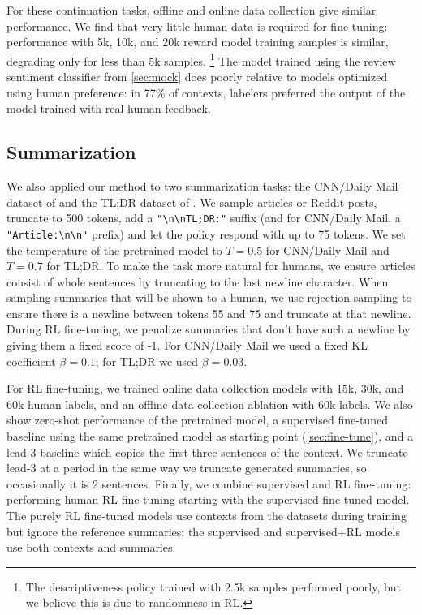 For these continuation tasks, offline and online data collection give similar performance. We find that very little human data is required for fine-tuning: performance with 5k, 10k, and 20k reward model training samples is similar, degrading only for less than 5k samples.
\footnote{The descriptiveness policy trained with 2.5k samples performed poorly, but we believe this is due to randomness in RL.} The model trained using the review sentiment classifier from \ref{sec:mock} does poorly relative to models optimized using human preference: in 77\% of contexts, labelers preferred the output of the model trained with real human feedback.

\subsection{Summarization \label{sec:summarization}}

We also applied our method to two summarization tasks: the CNN/Daily Mail dataset of \citet{hermann2015teaching} and the TL;DR dataset of \citet{volske2017tldr}. We sample articles or Reddit posts, truncate to 500 tokens, add a \verb+"\n\nTL;DR:"+ suffix (and for CNN/Daily Mail, a \verb+"Article:\n\n"+ prefix) and let the policy respond with up to 75 tokens.  We set the temperature of the pretrained model to $T = 0.5$ for CNN/Daily Mail and $T = 0.7$ for TL;DR.  To make the task more natural for humans, we ensure articles consist of whole sentences by truncating to the last newline character. When sampling summaries that will be shown to a human, we use rejection sampling to ensure there is a newline between tokens 55 and 75 and truncate at that newline. During RL fine-tuning, we penalize summaries that don't have such a newline by giving them a fixed score of -1. For CNN/Daily Mail we used a fixed KL coefficient $\beta = 0.1$; for TL;DR we used $\beta = 0.03$.

For RL fine-tuning, we trained online data collection models with 15k, 30k, and 60k human labels, and an offline data collection ablation with 60k labels.  We also show zero-shot performance of the pretrained model, a supervised fine-tuned baseline using the same pretrained model as starting point (\ref{sec:fine-tune}), and a lead-3 baseline which copies the first three sentences of the context.  We truncate lead-3 at a period in the same way we truncate generated summaries, so occasionally it is 2 sentences.  Finally, we combine supervised and RL fine-tuning: performing human RL fine-tuning starting with the supervised fine-tuned model.  The purely RL fine-tuned models use contexts from the datasets during training but ignore the reference summaries; the supervised and supervised+RL models use both contexts and summaries.

